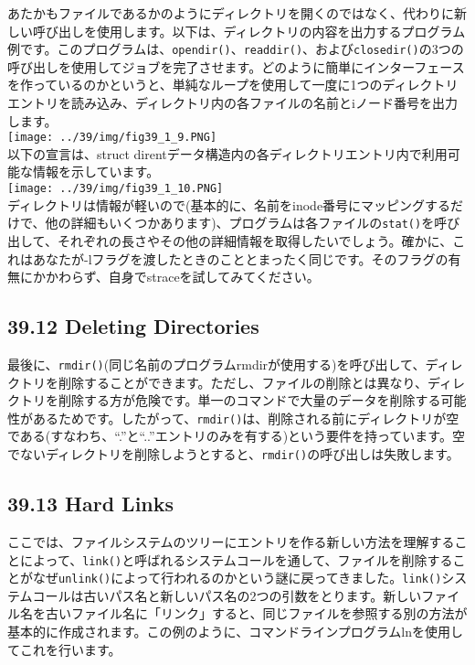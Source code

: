 あたかもファイルであるかのようにディレクトリを開くのではなく、代わりに新しい呼び出しを使用します。以下は、ディレクトリの内容を出力するプログラム例です。このプログラムは、\texttt{opendir()}、\texttt{readdir()}、および\texttt{closedir()}の3つの呼び出しを使用してジョブを完了させます。どのように簡単にインターフェースを作っているのかというと、単純なループを使用して一度に1つのディレクトリエントリを読み込み、ディレクトリ内の各ファイルの名前とiノード番号を出力します。\\
\texttt{[image: ../39/img/fig39\_1\_9.PNG]}\\
以下の宣言は、struct
direntデータ構造内の各ディレクトリエントリ内で利用可能な情報を示しています。\\
\texttt{[image: ../39/img/fig39\_1\_10.PNG]}\\
ディレクトリは情報が軽いので(基本的に、名前をinode番号にマッピングするだけで、他の詳細もいくつかあります)、プログラムは各ファイルの\texttt{stat()}を呼び出して、それぞれの長さやその他の詳細情報を取得したいでしょう。確かに、これはあなたが-lフラグを渡したときのこととまったく同じです。そのフラグの有無にかかわらず、自身でstraceを試してみてください。

\hypertarget{deleting-directories}{%
\subsection*{39.12 Deleting Directories}\label{deleting-directories}}

最後に、\texttt{rmdir()}(同じ名前のプログラムrmdirが使用する)を呼び出して、ディレクトリを削除することができます。ただし、ファイルの削除とは異なり、ディレクトリを削除する方が危険です。単一のコマンドで大量のデータを削除する可能性があるためです。したがって、\texttt{rmdir()}は、削除される前にディレクトリが空である(すなわち、``.''と``..''エントリのみを有する)という要件を持っています。空でないディレクトリを削除しようとすると、\texttt{rmdir()}の呼び出しは失敗します。

\hypertarget{hard-links}{%
\subsection*{39.13 Hard Links}\label{hard-links}}

ここでは、ファイルシステムのツリーにエントリを作る新しい方法を理解することによって、\texttt{link()}と呼ばれるシステムコールを通して、ファイルを削除することがなぜ\texttt{unlink()}によって行われるのかという謎に戻ってきました。\texttt{link()}システムコールは古いパス名と新しいパス名の2つの引数をとります。新しいファイル名を古いファイル名に「リンク」すると、同じファイルを参照する別の方法が基本的に作成されます。この例のように、コマンドラインプログラムlnを使用してこれを行います。

